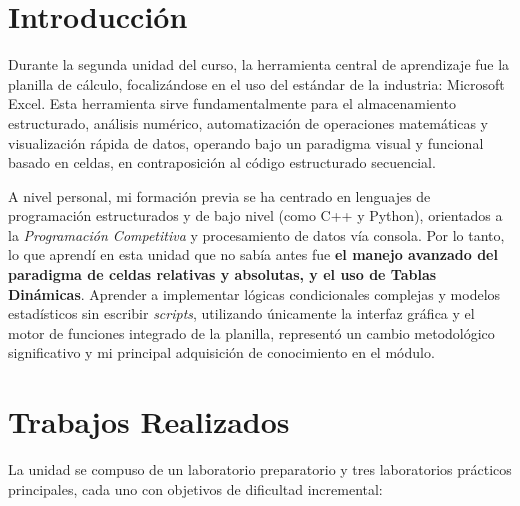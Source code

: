 \section{Introducción}

Durante la segunda unidad del curso, la herramienta central de aprendizaje fue la planilla de cálculo, focalizándose en el uso del estándar de la industria: Microsoft Excel. Esta herramienta sirve fundamentalmente para el almacenamiento estructurado, análisis numérico, automatización de operaciones matemáticas y visualización rápida de datos, operando bajo un paradigma visual y funcional basado en celdas, en contraposición al código estructurado secuencial.

A nivel personal, mi formación previa se ha centrado en lenguajes de programación estructurados y de bajo nivel (como C++ y Python), orientados a la \textit{Programación Competitiva} y procesamiento de datos vía consola. Por lo tanto, lo que aprendí en esta unidad que no sabía antes fue \textbf{el manejo avanzado del paradigma de celdas relativas y absolutas, y el uso de Tablas Dinámicas}. Aprender a implementar lógicas condicionales complejas y modelos estadísticos sin escribir \textit{scripts}, utilizando únicamente la interfaz gráfica y el motor de funciones integrado de la planilla, representó un cambio metodológico significativo y mi principal adquisición de conocimiento en el módulo.

\section{Trabajos Realizados}

La unidad se compuso de un laboratorio preparatorio y tres laboratorios prácticos principales, cada uno con objetivos de dificultad incremental:

